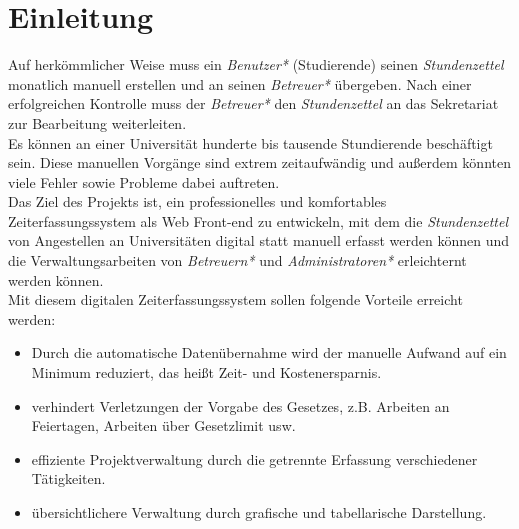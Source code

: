 \section{Einleitung}

Auf herkömmlicher Weise muss ein \emph{Benutzer*} (Studierende) seinen \emph{Stundenzettel} monatlich manuell erstellen und an seinen \emph{Betreuer*} übergeben. Nach einer erfolgreichen Kontrolle muss der \emph{Betreuer*} den \emph{Stundenzettel} an das Sekretariat zur Bearbeitung weiterleiten. \\

Es können an einer Universität hunderte bis tausende Stundierende beschäftigt sein. Diese manuellen Vorgänge sind extrem zeitaufwändig und außerdem könnten viele Fehler sowie Probleme dabei auftreten.\\

Das Ziel des Projekts ist, ein professionelles und komfortables Zeiterfassungssystem als Web Front-end zu entwickeln, mit dem die \emph{Stundenzettel} von Angestellen an Universitäten digital statt manuell erfasst werden können und die Verwaltungsarbeiten von \emph{Betreuern*} und \emph{Administratoren*} erleichternt werden können.\\

Mit diesem digitalen Zeiterfassungssystem sollen folgende Vorteile erreicht werden:\\

\begin{itemize}
	\item Durch die automatische Datenübernahme wird der manuelle Aufwand auf ein Minimum reduziert, das heißt Zeit- und Kostenersparnis.
	\item verhindert Verletzungen der Vorgabe des Gesetzes, z.B. Arbeiten an Feiertagen, Arbeiten über Gesetzlimit usw.
	\item effiziente Projektverwaltung durch die getrennte Erfassung verschiedener Tätigkeiten.
	\item übersichtlichere Verwaltung durch grafische und tabellarische Darstellung.
\end{itemize}
